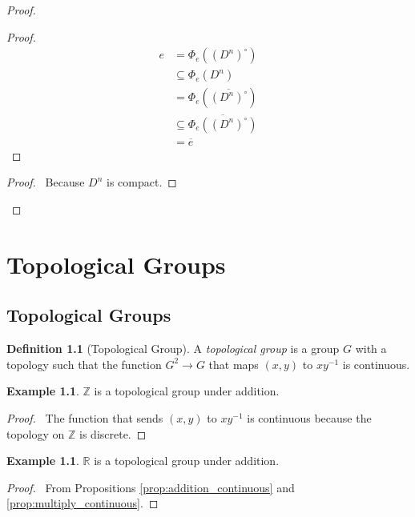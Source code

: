 \documentclass{book}
\let\qed\relax
\theoremstyle{definition}
\newtheorem{df}[ax]{Definition}
\newtheorem{ex}[ax]{Example}
\newcommand{\inv}[1]{\ensuremath{{#1}^{-1}}}
\begin{document}
\begin{proof}
\pf
{}
\begin{proof}
	\pf
	\begin{align*}
	e & = \Phi_e((D^n)^\circ) \\
	& \subseteq \Phi_e(D^n) \\
	& = \Phi_e(\overline{(D^n)^\circ}) \\
	& \subseteq \overline{\Phi_e((D^n)^\circ)} \\
	& = \overline{e}
	\end{align*}
\end{proof}
\begin{proof}
	\pf\ Because $D^n$ is compact.
\end{proof}
\qed
\end{proof}

\chapter{Topological Groups}

\section{Topological Groups}

\begin{df}[Topological Group]
A \emph{topological group} is a group $G$ with a topology such that the function $G^2 \rightarrow G$ that maps $(x,y)$ to $x\inv{y}$ is continuous.
\end{df}

\begin{ex}
$\mathbb{Z}$ is a topological group under addition.
\end{ex}

\begin{proof}
\pf\ The function that sends $(x,y)$ to $x \inv{y}$ is continuous because the topology on $\mathbb{Z}$ is discrete. \qed
\end{proof}

\begin{ex}
$\mathbb{R}$ is a topological group under addition.
\end{ex}

\begin{proof}
\pf\ From Propositions \ref{prop:addition_continuous} and \ref{prop:multiply_continuous}. \qed
\end{proof}
\end{document}
